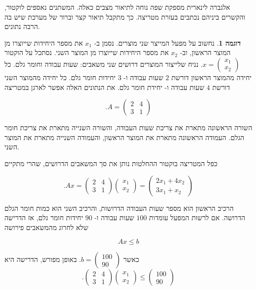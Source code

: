 \documentclass[12pt]{report}
\theoremstyle{plain}
\theoremstyle{definition}
\newtheorem{example}{דוגמה}[chapter]
\newcommand{\0}{\mathbf{0}}
\begin{document}
אלגברה לינארית מספקת שפה נוחה לתיאור מצבים כאלה.
המשתנים נאספים לוקטור, והקשרים ביניהם נכתבים בעזרת מטריצה.
כך מתקבל תיאור קצר וברור של מערכת שיש בה הרבה נתונים.

\begin{example}
נחשוב על מפעל המייצר שני מוצרים.
נסמן ב-
$x_1$
את מספר היחידות שייוצרו מן המוצר הראשון, וב-
$x_2$
את מספר היחידות שייוצרו מן המוצר השני. נסתכל על הוקטור
$x =
\begin{pmatrix}
x_1 \\
x_2
\end{pmatrix}$.
נניח שלייצור המוצרים דרושים שני משאבים: שעות עבודה וחומר גלם.
כל יחידה מהמוצר הראשון דורשת
$2$
שעות עבודה ו-
$3$
יחידות חומר גלם.
כל יחידה מהמוצר השני דורשת
$4$
שעות עבודה ו-
יחידת חומר גלם. את הנתונים האלה אפשר לארגן במטריצה

$$
.A =
\begin{pmatrix}
2 & 4 \\
3 & 1
\end{pmatrix}
$$

השורה הראשונה מתארת את צריכת שעות העבודה, והשורה השנייה מתארת את צריכת חומר הגלם.
העמודה הראשונה מתארת את המוצר הראשון, והעמודה השנייה מתארת את המוצר השני.

כפל המטריצה בוקטור ההחלטות נותן את סך המשאבים הדרושים, שהרי מתקיים

$$
.A x =
\begin{pmatrix}
2 & 4 \\
3 & 1
\end{pmatrix}
\begin{pmatrix}
x_1 \\
x_2
\end{pmatrix}
=
\begin{pmatrix}
2x_1+4x_2 \\
3x_1+x_2
\end{pmatrix}
$$

הרכיב הראשון הוא מספר שעות העבודה הדרושות, והרכיב השני הוא כמות חומר הגלם הדרושה. אם לרשות המפעל עומדות
$100$
שעות עבודה ו-
$90$
יחידות חומר גלם, אז הדרישה שלא לחרוג מהמשאבים פירושה

$$
A x \leq b
$$

כאשר
$b =
\begin{pmatrix}
100 \\
90
\end{pmatrix}$.
באופן מפורש, הדרישה היא
$$
.\begin{pmatrix}
2 & 4 \\
3 & 1
\end{pmatrix}
\begin{pmatrix}
x_1 \\
x_2
\end{pmatrix}
\leq
\begin{pmatrix}
100 \\
90
\end{pmatrix}
$$


\end{example}
\end{document}
